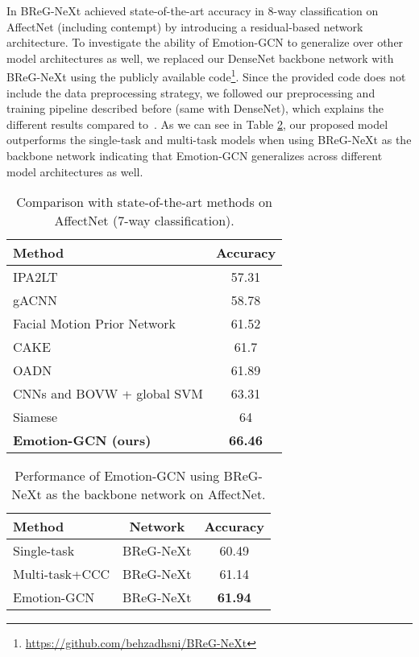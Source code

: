\documentclass[a4paper, 10pt, conference]{ieeeconf}      \usepackage{FG2021}
\begin{document}
In \cite{hasani2020breg} BReG-NeXt achieved state-of-the-art accuracy in 8-way classification on AffectNet (including contempt) by introducing a residual-based network architecture. To investigate the ability of Emotion-GCN to generalize over other model architectures as well, we replaced our DenseNet backbone network with BReG-NeXt using the publicly available code\footnote{\url{https://github.com/behzadhsni/BReG-NeXt}}. Since the provided code does not include the data preprocessing strategy, we followed our preprocessing and training pipeline described before (same with DenseNet), which explains the different results compared to~\cite{hasani2020breg}. As we can see in Table \ref{table:results_breg}, our proposed model outperforms the single-task and multi-task models when using BReG-NeXt as the backbone network indicating that Emotion-GCN generalizes across different model architectures as well.


\begin{table}[t]
  \caption{Comparison with state-of-the-art methods on AffectNet (7-way classification).}
  \label{table:results_sota}
  \begin{center}
  \begin{tabular}{lc}
    \textbf{Method} & \textbf{Accuracy} \\
    \toprule
    IPA2LT \cite{zeng2018facial}                         & 57.31 \\
    gACNN \cite{li2018occlusion}                         & 58.78 \\
    Facial Motion Prior Network \cite{chen2019facial}    & 61.52 \\
    CAKE \cite{kervadec2018cake}                         & 61.7 \\
    OADN \cite{ding2020occlusion}                        & 61.89 \\
    CNNs and BOVW + global SVM \cite{georgescu2019local} & 63.31 \\
    Siamese \cite{hayale2019facial}                      & 64 \\
    \textbf{Emotion-GCN (ours)}   & \textbf{66.46} \\
  \end{tabular}
  \end{center}
\end{table}

\begin{table}[t]
  \caption{Performance of Emotion-GCN using BReG-NeXt as the backbone network on AffectNet.}
  \label{table:results_breg}
  \begin{center}
  \begin{tabular}{lcc}
    \textbf{Method} & \textbf{Network} & \textbf{Accuracy} \\
    \toprule
    Single-task & BReG-NeXt                                            & 60.49\\
    Multi-task+CCC & BReG-NeXt                               & 61.14\\
    Emotion-GCN & BReG-NeXt                              & \textbf{61.94}\\
  \end{tabular}
  \end{center}
\end{table}
\end{document}

